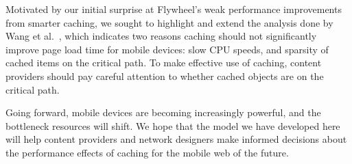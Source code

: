 
Motivated by our initial surprise at Flywheel's weak performance improvements
from smarter caching, we sought to highlight and extend the analysis done by
Wang et al.~\cite{wang2013demystifying}, which indicates two reasons caching
should not
significantly improve page load time for mobile devices: slow CPU
speeds, and sparsity of cached items on the critical
path.
To make effective use of caching, content providers should pay careful
attention to whether cached objects are on the critical path.


Going forward, mobile devices are becoming increasingly powerful, and the
bottleneck resources will shift. We hope that the model we have developed here
will help content providers and network designers make informed decisions about the performance
effects of caching for the mobile web of the future.%
%
%
%

